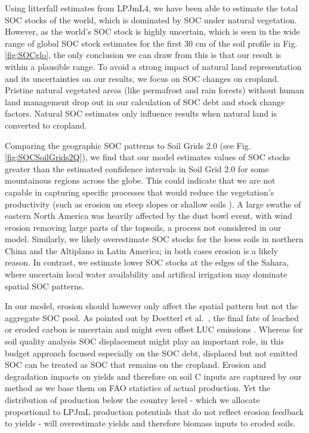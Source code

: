\documentclass[gc, manuscript]{copernicus}
\begin{document}
Using litterfall estimates from LPJmL4, we have been able to estimate the total SOC stocks of the world, which is dominated by SOC under natural vegetation. However, as the world's SOC stock is highly uncertain, which is seen in the wide range of global SOC stock estimates for the first 30 cm of the soil profile \citep{batjes_harmonized_2016, hengl_soilgrids250m_2017, fao_global_2018, schaphoff_lpjml4_2018-1, poggio_soilgrids_2021, sanderman_soil_2017} in Fig. \ref{fig:SOCglo}, the only conclusion we can draw from this is that our result is within a plausible range.
To avoid a strong impact of natural land representation and its uncertainties on our results, we focus on SOC changes on cropland. Pristine natural vegetated areas (like permafrost and rain forests) without human land management drop out in our calculation of SOC debt and stock change factors. Natural SOC estimates only influence results when natural land is converted to cropland.

Comparing the geographic SOC patterns to Soil Grids 2.0 \citep{poggio_soilgrids_2021} (see Fig. \ref{fig:SOCSoilGrids2Q}), we find that our model estimates values of SOC stocks greater than the estimated confidence intervals in Soil Grid 2.0 for some mountainous regions across the globe. This could indicate that we are not capable in capturing specific processes that would reduce the vegetation's productivity (such as erosion on steep slopes or shallow soils \citep{borrelli_assessment_2017}). A large swathe of eastern North America was heavily affected by the dust bowl event, with wind erosion removing large parts of the topsoils, a process not considered in our model. Similarly, we likely overestimate SOC stocks for the loess soils in northern China and the Altiplano in Latin America; in both cases erosion is a likely reason. In contrast, we estimate lower SOC stocks at the edges of the Sahara, where uncertain local water availability and artifical irrigation may dominate spatial SOC patterns.

In our model, erosion should however only affect the spatial pattern but not the aggregate SOC pool. As pointed out by Doetterl et al.~\citeyearpar{doetterl_erosion_2016}, the final fate of leached or eroded carbon is uncertain and might even offset LUC emissions \citep{wang_human-induced_2017}. Whereas for soil quality analysis SOC displacement might play an important role, in this budget approach focused especially on the SOC debt, displaced but not emitted SOC can be treated as SOC that remains on the cropland. Erosion and degradation impacts on yields and therefore on soil C inputs are captured by our method as we base them on FAO statistics of actual production. Yet the distribution of production below the country level - which we allocate proportional to LPJmL production potentials that do not reflect erosion feedback to yields - will overestimate yields and therefore biomass inputs to eroded soils.
\end{document}
